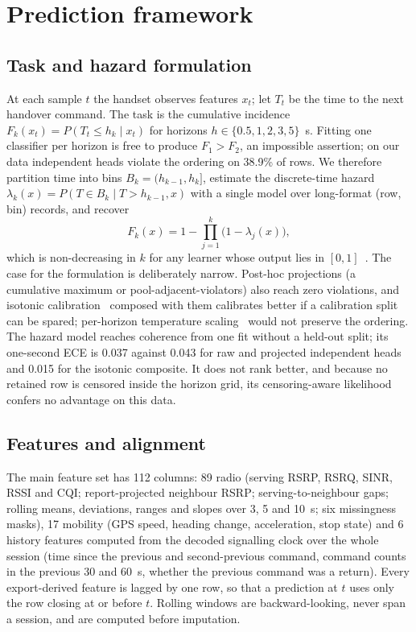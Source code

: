 \documentclass[preprint,review,12pt]{elsarticle}\usepackage{lineno}\linenumbers
\begin{document}
\section{Prediction framework}
\label{sec:framework}

\subsection{Task and hazard formulation}
At each sample $t$ the handset observes features $x_t$; let $T_t$ be the time to the next handover command. The task is the cumulative incidence $F_k(x_t) = P(T_t \le h_k \mid x_t)$ for horizons $h \in \{0.5, 1, 2, 3, 5\}$~s. Fitting one classifier per horizon is free to produce $F_1 > F_2$, an impossible assertion; on our data independent heads violate the ordering on 38.9\% of rows. We therefore partition time into bins $B_k = (h_{k-1}, h_k]$, estimate the discrete-time hazard $\lambda_k(x) = P(T \in B_k \mid T > h_{k-1}, x)$ with a single model over long-format (row, bin) records, and recover
\begin{equation}
F_k(x) = 1 - \prod_{j=1}^{k} \bigl(1 - \lambda_j(x)\bigr),
\label{eq:hazard}
\end{equation}
which is non-decreasing in $k$ for any learner whose output lies in $[0,1]$~\cite{ref48,ref49,ref50}. The case for the formulation is deliberately narrow. Post-hoc projections (a cumulative maximum or pool-adjacent-violators) also reach zero violations, and isotonic calibration~\cite{ref34} composed with them calibrates better if a calibration split can be spared; per-horizon temperature scaling~\cite{ref33} would not preserve the ordering. The hazard model reaches coherence from one fit without a held-out split; its one-second ECE is 0.037 against 0.043 for raw and projected independent heads and 0.015 for the isotonic composite. It does not rank better, and because no retained row is censored inside the horizon grid, its censoring-aware likelihood confers no advantage on this data.

\subsection{Features and alignment}
The main feature set has 112 columns: 89 radio (serving RSRP, RSRQ, SINR, RSSI and CQI; report-projected neighbour RSRP; serving-to-neighbour gaps; rolling means, deviations, ranges and slopes over 3, 5 and 10~s; six missingness masks), 17 mobility (GPS speed, heading change, acceleration, stop state) and 6 history features computed from the decoded signalling clock over the whole session (time since the previous and second-previous command, command counts in the previous 30 and 60~s, whether the previous command was a return). Every export-derived feature is lagged by one row, so that a prediction at $t$ uses only the row closing at or before $t$. Rolling windows are backward-looking, never span a session, and are computed before imputation.
\end{document}
